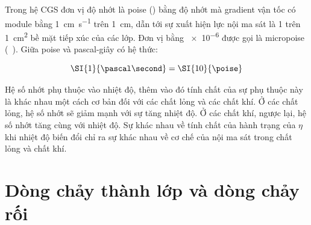 Trong hệ CGS đơn vị độ nhớt là poise (\si{\poise}) bằng độ nhớt mà gradient vận tốc có module  bằng \SI{1}{\centi\metre\per\second} trên \SI{1}{\centi\metre}, dẫn tới sự xuất hiện lực nội ma sát là \SI{1}{\dyne} trên \SI{1}{\centi\metre\squared} bề mặt tiếp xúc của các lớp. Đơn vị bằng \SI{e-6}{\poise} được gọi là micropoise (\si{\micro\poise}). Giữa poise và pascal-giây có hệ thức:

\begin{equation*}
	\SI{1}{\pascal\second} = \SI{10}{\poise}
\end{equation*}


Hệ số nhớt phụ thuộc vào nhiệt độ, thêm vào đó tính chất của sự phụ thuộc này là khác nhau một cách cơ bản đối với các chất lỏng và các chất khí. Ở các chất lỏng, hệ số nhớt sẽ giảm mạnh với sự tăng nhiệt độ. Ở các chất khí, ngược lại, hệ số nhớt tăng cùng với nhiệt độ. Sự khác nhau về tính chất của hành trạng của $\eta$ khi nhiệt độ biến đổi chỉ ra sự khác nhau về cơ chế của nội ma sát trong chất lỏng và chất khí.


\section{Dòng chảy thành lớp và dòng chảy rối}\label{sec:9_5}


